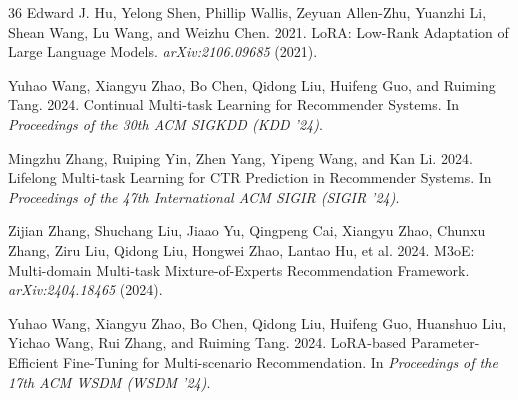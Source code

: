 \documentclass[review,anonymous]{acmart}
\begin{document}
\begin{thebibliography}{36}
Edward J. Hu, Yelong Shen, Phillip Wallis, Zeyuan Allen-Zhu, Yuanzhi Li, Shean
Wang, Lu Wang, and Weizhu Chen. 2021. LoRA: Low-Rank Adaptation of Large Language
Models. \emph{arXiv:2106.09685} (2021).

Yuhao Wang, Xiangyu Zhao, Bo Chen, Qidong Liu, Huifeng Guo, and Ruiming Tang.
2024. Continual Multi-task Learning for Recommender Systems. In \emph{Proceedings
of the 30th ACM SIGKDD (KDD '24)}.

Mingzhu Zhang, Ruiping Yin, Zhen Yang, Yipeng Wang, and Kan Li. 2024. Lifelong
Multi-task Learning for CTR Prediction in Recommender Systems. In \emph{Proceedings
of the 47th International ACM SIGIR (SIGIR '24)}.

Zijian Zhang, Shuchang Liu, Jiaao Yu, Qingpeng Cai, Xiangyu Zhao, Chunxu Zhang,
Ziru Liu, Qidong Liu, Hongwei Zhao, Lantao Hu, et al. 2024. M3oE: Multi-domain
Multi-task Mixture-of-Experts Recommendation Framework. \emph{arXiv:2404.18465}
(2024).

Yuhao Wang, Xiangyu Zhao, Bo Chen, Qidong Liu, Huifeng Guo, Huanshuo Liu, Yichao
Wang, Rui Zhang, and Ruiming Tang. 2024. LoRA-based Parameter-Efficient
Fine-Tuning for Multi-scenario Recommendation. In \emph{Proceedings of the 17th
ACM WSDM (WSDM '24)}.

\end{thebibliography}
\end{document}
